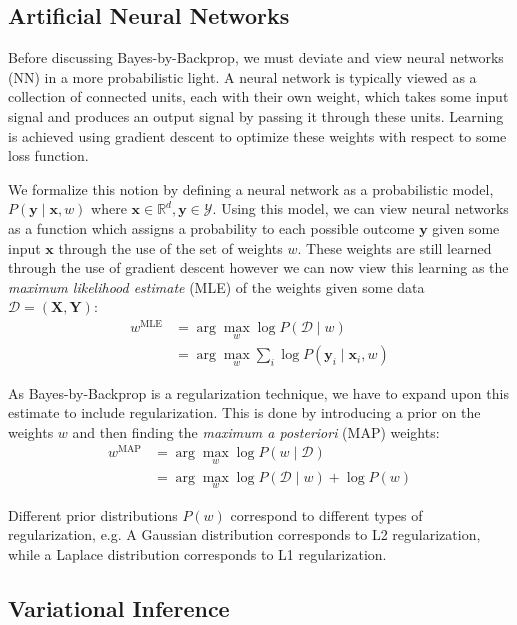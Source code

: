 \documentclass[11pt]{article}
\begin{document}
\subsection{Artificial Neural Networks} Before discussing Bayes-by-Backprop, we
must deviate and view neural networks (NN) in a more probabilistic light.
A neural network is typically viewed as a collection of connected units, each
with their own weight, which takes some input signal and produces an output
signal by passing it through these units.  Learning is achieved using gradient
descent to optimize these weights with respect to some loss function. 

We formalize this notion by defining a neural network as a probabilistic model,
$P(\bm y\mid \bm x,w)$ where $\bm x \in \mathbb{R}^d, \bm y \in \mathcal{Y}$.
Using this model, we can view neural networks as a function which assigns
a probability to each possible outcome $\bm y$ given some input $\bm x$ through
the use of the set of weights $w$. These weights are still learned through the
use of gradient descent however we can now view this learning as the
\emph{maximum likelihood estimate} (MLE) of the weights given some data
$\mathcal{D}=(\bm X,\bm Y)$:
%
\begin{align*}
  w^\text{MLE} &= \arg\max_w \log P(\mathcal{D}\mid w) \\ 
  &= \arg\max_w \sum_i \log P(\bm y_i\mid \bm x_i, w) 
\end{align*}

As Bayes-by-Backprop is a regularization technique, we have to expand upon this
estimate to include regularization. This is done by introducing a prior on the
weights $w$ and then finding the \emph{maximum a posteriori} (MAP) weights:
%
\begin{align*}
  w^\text{MAP} &= \arg\max_w \log P(w\mid \mathcal{D}) \\
  &= \arg\max_w \log P(\mathcal{D}\mid w) + \log P(w) 
\end{align*}

Different prior distributions $P(w)$ correspond to different types of
regularization, e.g. A Gaussian distribution corresponds to L2 regularization,
while a Laplace distribution corresponds to L1 regularization.


\subsection{Variational Inference}\label{sec:VI}
\end{document}
